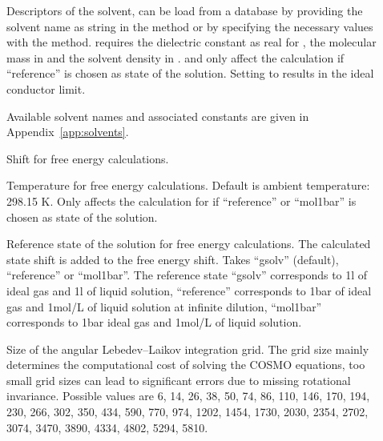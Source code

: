 \begin{description}
  \item[] Descriptors of the solvent, can be load from a database
    by providing the solvent name as string in the  method or
    by specifying the necessary values with the  method.
     requires the dielectric constant as real for ,
    the molecular mass in   and the
    solvent density in  .
     and  only affect the calculation if
    ``reference'' is chosen as state of the solution.
    Setting  to  results in the ideal conductor limit.

    Available solvent names and associated constants are given in Appendix~\ref{app:solvents}.

  \item[]  Shift for free energy
    calculations.

  \item[] Temperature for free energy calculations. Default is
    ambient temperature: 298.15 K.
    Only affects the calculation for if ``reference'' or ``mol1bar'' is chosen
    as state of the solution.

  \item[] 
    Reference state of the solution for free energy calculations.
    The calculated state shift is added to the free energy shift.
    Takes ``gsolv'' (default), ``reference'' or ``mol1bar''.
    The reference state ``gsolv'' corresponds to 1\;l of ideal gas and 1\;l of
    liquid  solution,
    ``reference'' corresponds to 1\;bar of ideal gas and 1\;mol/L of liquid
    solution at infinite dilution,
    ``mol1bar'' corresponds to 1\;bar ideal gas and 1\;mol/L of liquid solution.

  \item[]
    Size of the angular Lebedev--Laikov integration grid.\cite{lebedev1999}
    The grid size mainly determines the computational cost of solving the
    COSMO equations, too small grid sizes can lead to significant errors
    due to missing rotational invariance.
    Possible values are
    6, 14, 26, 38, 50, 74, 86, 110, 146, 170, 194, 230, 266, 302, 350,
    434, 590, 770, 974, 1202, 1454, 1730, 2030, 2354, 2702, 3074, 3470, 3890,
    4334, 4802, 5294, 5810.


\end{description}
